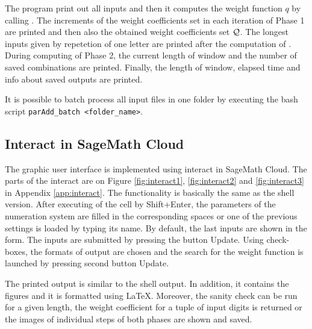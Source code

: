 The program print out all inputs and then it computes the weight function $q$ by calling . The increments of the weight coefficients set in each iteration of Phase 1 are printed and then also the obtained weight coefficients set $\mathcal{Q}$. The longest inputs given by repetetion of one letter are printed after the computation of . During computing of Phase 2, the current length of window and the number of saved combinations are printed. Finally, the length of window, elapsed time and info about saved outputs are printed.  

It is possible to batch process all input files in one folder by executing the bash script \verb+parAdd_batch <folder_name>+.  

\subsection{Interact in SageMath Cloud}
The graphic user interface is implemented using interact in SageMath Cloud. The parts of the interact are on Figure \ref{fig:interact1}, \ref{fig:interact2} and \ref{fig:interact3} in Appendix \ref{app:interact}. The functionality is basically the same as the shell version. After executing of the cell by Shift+Enter, the parameters of the numeration system are filled in the corresponding spaces or one of the previous settings is loaded by typing its name.  By default, the last inputs are shown in the form. The inputs are submitted by pressing the button Update. Using check-boxes, the formats of output are chosen and the search for the weight function is launched by pressing second button Update.

The printed output is similar to the shell output. In addition, it contains the figures and it is formatted using \LaTeX. Moreover, the sanity check can be run for a given length, the weight coefficient for a tuple of  input digits is returned or the images of individual steps of both phases are shown and saved.
